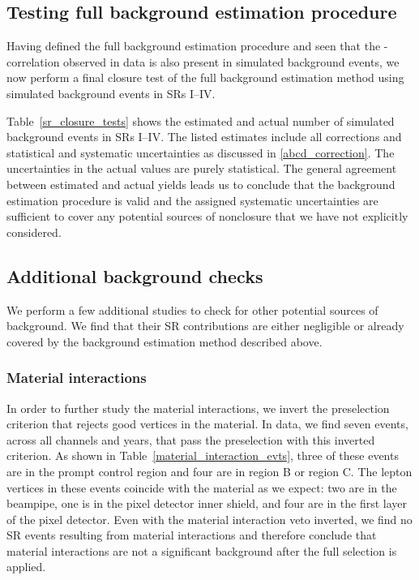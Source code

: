 \subsection{Testing full background estimation procedure}

Having defined the full background estimation procedure and seen that the \ada-\adb correlation observed in data is also present in simulated background events, we now perform a final closure test of the full background estimation method using simulated background events in SRs I--IV.

Table~\ref{sr_closure_tests} shows the estimated and actual number of simulated background events in SRs I--IV. The listed estimates include all corrections and statistical and systematic uncertainties as discussed in \ref{abcd_correction}. The uncertainties in the actual values are purely statistical. The general agreement between estimated and actual yields leads us to conclude that the background estimation procedure is valid and the assigned systematic uncertainties are sufficient to cover any potential sources of nonclosure that we have not explicitly considered.



\subsection{Additional background checks}
\label{additional_bg_checks}
We perform a few additional studies to check for other potential sources of background. We find that their SR contributions are either negligible or already covered by the background estimation method described above.

\subsubsection{Material interactions}
In order to further study the material interactions, we invert the preselection criterion that rejects good vertices in the material. In data, we find seven events, across all channels and years, that pass the preselection with this inverted criterion. As shown in Table~\ref{material_interaction_evts}, three of these events are in the prompt control region and four are in region B or region C. The lepton vertices in these events coincide with the material as we expect: two are in the beampipe, one is in the pixel detector inner shield, and four are in the first layer of the pixel detector. Even with the material interaction veto inverted, we find no SR events resulting from material interactions and therefore conclude that material interactions are not a significant background after the full selection is applied.

